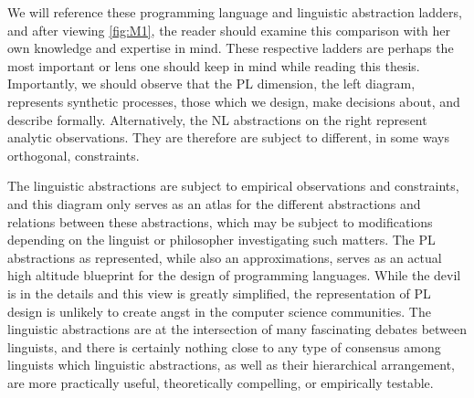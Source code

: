 We will reference these programming language and linguistic abstraction ladders,
and after viewing \autoref{fig:M1}, the reader should examine this
comparison with her own knowledge and expertise in mind. These respective
ladders are perhaps the most important or lens one should keep in mind while
reading this thesis. Importantly, we should observe that the PL dimension, the
left diagram, represents synthetic processes, those which we design, make
decisions about, and describe formally. Alternatively, the NL abstractions on
the right represent analytic observations. They are therefore are subject to
different, in some ways orthogonal, constraints.

The linguistic abstractions are subject to empirical observations and
constraints, and this diagram only serves as an atlas for the different
abstractions and relations between these abstractions, which may be subject to
modifications depending on the linguist or philosopher investigating such
matters. The PL abstractions as represented, while also an approximations,
serves as an actual high altitude blueprint for the design of programming
languages. While the devil is in the details and this view is greatly
simplified, the representation of PL design is unlikely to create angst in the
computer science communities. The linguistic abstractions are at the
intersection of many fascinating debates between linguists, and there is
certainly nothing close to any type of consensus among linguists which
linguistic abstractions, as well as their hierarchical arrangement, are more
practically useful, theoretically compelling, or empirically testable.

